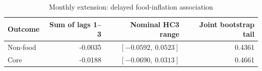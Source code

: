 \begin{table}[H]
\centering\small
\caption{Monthly extension: delayed food-inflation association}
\label{tab:spillover}
\begin{tabular}{lrrr}
\toprule
Outcome & Sum of lags 1--3 & Nominal HC3 range & Joint bootstrap tail\\
\midrule
Non-food & -0.0035 & $[-0.0592,\ 0.0523]$ & 0.4361\\
Core & -0.0188 & $[-0.0690,\ 0.0313]$ & 0.4661\\
\bottomrule
\end{tabular}
\end{table}

